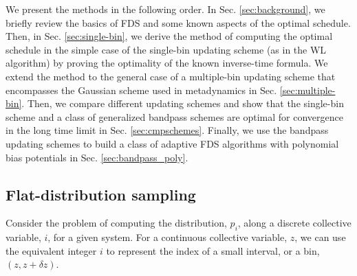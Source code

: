 \documentclass[reprint, superscriptaddress, floatfix]{revtex4-1}
\begin{document}
We present the methods
in the following order.
%
In Sec. \ref{sec:background},
we briefly review the basics of FDS
and some known aspects of the optimal schedule.
%
Then, in Sec. \ref{sec:single-bin},
we derive the method of
computing the optimal schedule
in the simple case of the
single-bin updating scheme
(as in the WL algorithm)
by proving the optimality
of the known inverse-time formula.
%
We extend the method to the general case
of a multiple-bin updating scheme
that encompasses the Gaussian scheme used in metadynamics
in Sec. \ref{sec:multiple-bin}.
%
Then, we compare different updating schemes
and show that the single-bin scheme
and a class of generalized bandpass schemes
are optimal for convergence
in the long time limit
in Sec. \ref{sec:cmpschemes}.
%
Finally,
we use the bandpass updating schemes
to build a class of adaptive FDS algorithms
with polynomial bias potentials
in Sec. \ref{sec:bandpass_poly}.



\subsection{\label{sec:background}
Flat-distribution sampling}






Consider the problem of computing
the distribution, $p_i$,
along a discrete collective variable, $i$,
for a given system.
%
%
For a continuous collective variable, $z$,
we can use the equivalent integer $i$ to represent
the index of a small interval, or a bin,
$(z, z + \delta z)$.
%
\end{document}
